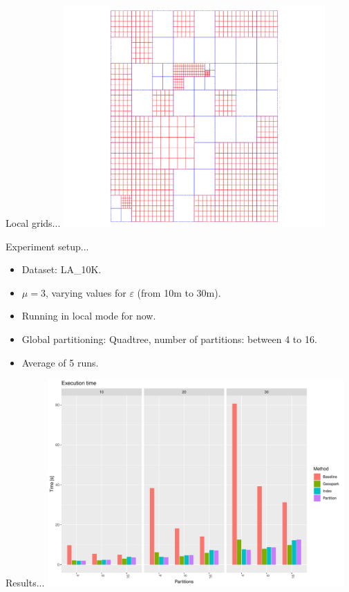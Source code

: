 \documentclass{beamer}
\begin{document}
\begin{frame}{Local grids...}
    \centering
    \includegraphics[width=0.75\textwidth]{figures/lgrids}
\end{frame}

\begin{frame}{Experiment setup...}
    \begin{itemize}
        \item Dataset: LA\_10K.
        \item $\mu=3$, varying values for $\varepsilon$ (from 10m to 30m).
        \item Running in local mode for now.
        \item Global partitioning: Quadtree, number of partitions: between 4 to 16.
        \item Average of 5 runs.
    \end{itemize}
\end{frame}

\begin{frame}{Results...}
    \centering
    \includegraphics[width=0.85\textwidth]{figures/Test}
\end{frame}
\end{document}

